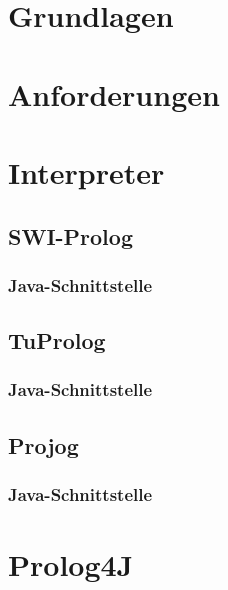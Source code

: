 
\section{Grundlagen}

\section{Anforderungen}

\section{Interpreter}
\subsection{SWI-Prolog}
\subsubsection{Java-Schnittstelle}
\subsection{TuProlog}
\subsubsection{Java-Schnittstelle}
\subsection{Projog}
\subsubsection{Java-Schnittstelle}

\section{Prolog4J}